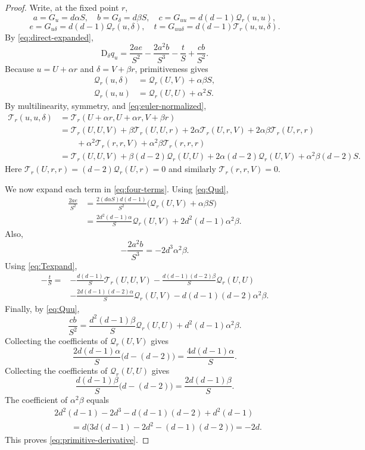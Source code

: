 \documentclass[11pt]{article}
\theoremstyle{definition}
\newcommand{\D}{\mathrm{D}}
\newcommand{\Q}{\mathcal{Q}}
\newcommand{\T}{\mathcal{T}}
\begin{document}
\begin{proof}
Write, at the fixed point $r$,
\[
 a=G_u=d\alpha S,
 \quad b=G_\delta=d\beta S,
 \quad c=G_{uu}=d(d-1)\Q_r(u,u),
\]
\[
 e=G_{u\delta}=d(d-1)\Q_r(u,\delta),
 \quad t=G_{uu\delta}=d(d-1)\T_r(u,u,\delta).
\]
By \eqref{eq:direct-expanded},
\begin{equation}\label{eq:four-terms}
 \D_\delta q_u=\frac{2ae}{S^2}-\frac{2a^2b}{S^3}-\frac{t}{S}+\frac{cb}{S^2}.
\end{equation}
Because $u=U+\alpha r$ and $\delta=V+\beta r$, primitiveness gives
\begin{align}
 \Q_r(u,\delta)&=\Q_r(U,V)+\alpha\beta S,\label{eq:Qud}\\
 \Q_r(u,u)&=\Q_r(U,U)+\alpha^2S.\label{eq:Quu}
\end{align}
By multilinearity, symmetry, and \eqref{eq:euler-normalized},
\begin{align}
 \T_r(u,u,\delta)
 &=\T_r(U+\alpha r,U+\alpha r,V+\beta r)\nonumber\\
 &=\T_r(U,U,V)
   +\beta\T_r(U,U,r)
   +2\alpha\T_r(U,r,V)
   +2\alpha\beta\T_r(U,r,r)\nonumber\\
 &\qquad
   +\alpha^2\T_r(r,r,V)
   +\alpha^2\beta\T_r(r,r,r)\nonumber\\
 &=\T_r(U,U,V)
   +\beta(d-2)\Q_r(U,U)
   +2\alpha(d-2)\Q_r(U,V)
   +\alpha^2\beta(d-2)S.                 \label{eq:Texpand}
\end{align}
Here $\T_r(U,r,r)=(d-2)\Q_r(U,r)=0$ and similarly
$\T_r(r,r,V)=0$.

We now expand each term in \eqref{eq:four-terms}.  Using \eqref{eq:Qud},
\begin{align*}
 \frac{2ae}{S^2}
 &=\frac{2(d\alpha S)d(d-1)}{S^2}
   \bigl(\Q_r(U,V)+\alpha\beta S\bigr)\\
 &=\frac{2d^2(d-1)\alpha}{S}\Q_r(U,V)
   +2d^2(d-1)\alpha^2\beta.
\end{align*}
Also,
\[
 -\frac{2a^2b}{S^3}=-2d^3\alpha^2\beta.
\]
Using \eqref{eq:Texpand},
\begin{align*}
 -\frac{t}{S}
 ={}&-\frac{d(d-1)}S\T_r(U,U,V)
     -\frac{d(d-1)(d-2)\beta}{S}\Q_r(U,U)\\
    &-\frac{2d(d-1)(d-2)\alpha}{S}\Q_r(U,V)
     -d(d-1)(d-2)\alpha^2\beta.
\end{align*}
Finally, by \eqref{eq:Quu},
\[
 \frac{cb}{S^2}
 =\frac{d^2(d-1)\beta}{S}\Q_r(U,U)
  +d^2(d-1)\alpha^2\beta.
\]
Collecting the coefficients of $\Q_r(U,V)$ gives
\[
 \frac{2d(d-1)\alpha}{S}\bigl(d-(d-2)\bigr)
 =\frac{4d(d-1)\alpha}{S}.
\]
Collecting the coefficients of $\Q_r(U,U)$ gives
\[
 \frac{d(d-1)\beta}{S}\bigl(d-(d-2)\bigr)
 =\frac{2d(d-1)\beta}{S}.
\]
The coefficient of $\alpha^2\beta$ equals
\begin{align*}
 &2d^2(d-1)-2d^3-d(d-1)(d-2)+d^2(d-1)\\
 &\qquad
 =d\bigl(3d(d-1)-2d^2-(d-1)(d-2)\bigr)=-2d.
\end{align*}
This proves \eqref{eq:primitive-derivative}.
\end{proof}
\end{document}
